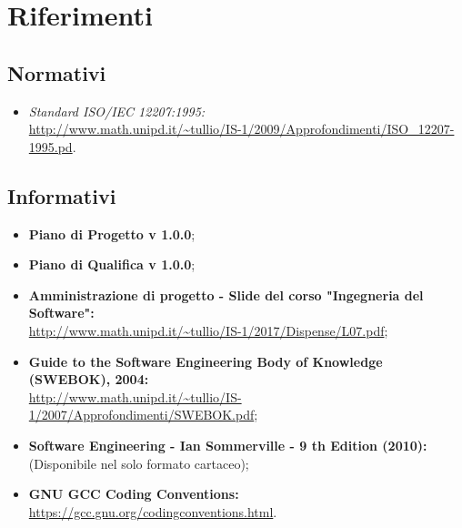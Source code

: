 \documentclass[./NormediProgetto.tex]{subfiles}
\begin{document}
\section{Riferimenti}

\subsection{Normativi}

\begin{itemize}
	\item \textit{Standard ISO/IEC 12207:1995:}\\
	 \url{http://www.math.unipd.it/~tullio/IS-1/2009/Approfondimenti/ISO_12207-1995.pd}.
\end{itemize}

\subsection{Informativi}

\begin{itemize}
	\item \textbf{Piano di Progetto v 1.0.0};
	\item \textbf{Piano di Qualifica v 1.0.0};
	\item \textbf{Amministrazione di progetto - Slide del corso "Ingegneria del
	Software":}\\	\url{http://www.math.unipd.it/~tullio/IS-1/2017/Dispense/L07.pdf};
	\item \textbf{Guide to the Software Engineering Body of Knowledge (SWEBOK), 2004:}\\
	\url{http://www.math.unipd.it/~tullio/IS-1/2007/Approfondimenti/SWEBOK.pdf};
	\item \textbf{Software Engineering - Ian Sommerville - 9 th Edition (2010):}\\
	(Disponibile nel solo formato cartaceo);
	\item \textbf{GNU GCC Coding Conventions:}\\ \url{https://gcc.gnu.org/codingconventions.html}.
\end{itemize}
\end{document}
